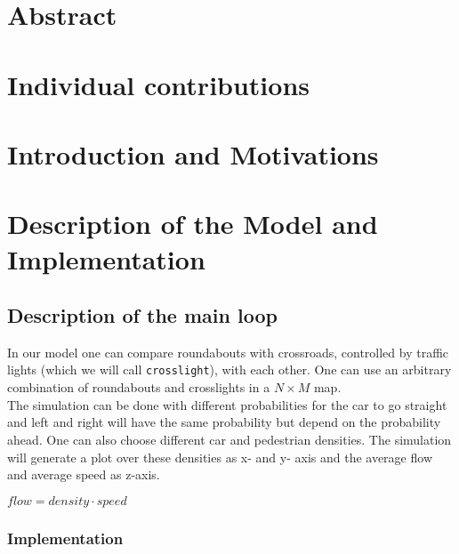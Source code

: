 \documentclass[11pt]{article}
\begin{document}

\tableofcontents

\newpage




\section{Abstract}

\section{Individual contributions}

\section{Introduction and Motivations}

\section{Description of the Model and Implementation}

\subsection{Description of the main loop}

In our model one can compare roundabouts with crossroads, controlled by traffic lights (which we will call \texttt{crosslight}), with each other. One can use an arbitrary combination of roundabouts and crosslights in a $N \times M$ map. \\
The simulation can be done with different probabilities for the car to go straight and left and right will have the same probability but depend on the probability ahead. One can also choose different car and pedestrian densities. 
The simulation will generate a plot over these densities as x- and y- axis and the average flow and average speed as z-axis. 

\begin{center} 
$flow = density \cdot speed$
\end{center}

\subsubsection{Implementation}
\end{document}
